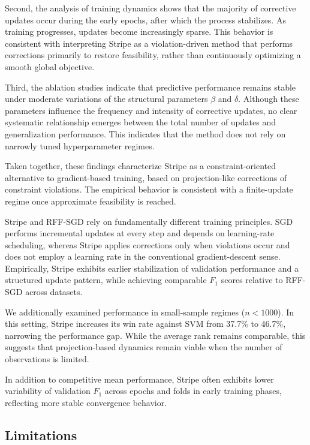 \documentclass[a4paper,fleqn]{cas-sc}
\begin{document}
Second, the analysis of training dynamics shows that the majority of corrective updates occur during the early epochs, after which the process stabilizes.
As training progresses, updates become increasingly sparse.
This behavior is consistent with interpreting Stripe as a violation-driven method that performs corrections primarily to restore feasibility, rather than continuously optimizing a smooth global objective.

Third, the ablation studies indicate that predictive performance remains stable under moderate variations of the structural parameters $\beta$ and $\delta$.
Although these parameters influence the frequency and intensity of corrective updates, no clear systematic relationship emerges between the total number of updates and generalization performance.
This indicates that the method does not rely on narrowly tuned hyperparameter regimes.

Taken together, these findings characterize Stripe as a constraint-oriented alternative to gradient-based training, based on projection-like corrections of constraint violations.
The empirical behavior is consistent with a finite-update regime once approximate feasibility is reached.

Stripe and RFF-SGD rely on fundamentally different training principles.
SGD performs incremental updates at every step and depends on learning-rate scheduling, whereas Stripe applies corrections only when violations occur and does not employ a learning rate in the conventional gradient-descent sense.
Empirically, Stripe exhibits earlier stabilization of validation performance and a structured update pattern, while achieving comparable $F_1$ scores relative to RFF-SGD across datasets.

We additionally examined performance in small-sample regimes ($n < 1000$).
In this setting, Stripe increases its win rate against SVM from 37.7\% to 46.7\%, narrowing the performance gap.
While the average rank remains comparable, this suggests that projection-based dynamics remain viable when the number of observations is limited.

In addition to competitive mean performance, Stripe often exhibits lower variability of validation $F_1$ across epochs and folds in early training phases, reflecting more stable convergence behavior.

\subsection{Limitations}
\end{document}

